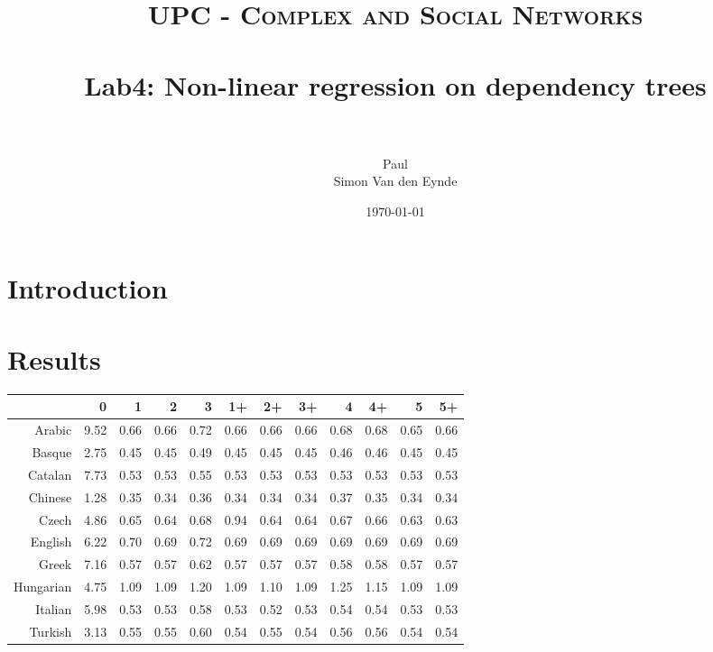 \documentclass[paper=a4, fontsize=11pt]{scrartcl} %
\title{	
\normalfont \normalsize 
\textsc{UPC - Complex and Social Networks} \\ [25pt] %
\horrule{0.5pt} \\[0.4cm] %
\huge Lab4: Non-linear regression on dependency trees \\ %
\horrule{2pt} \\[0.5cm] %
}
\author{Paul\\Simon Van den Eynde} %
\date{\normalsize\today} %
\begin{document}
\maketitle %



\section{Introduction}

\section{Results}
\begin{table}[ht]
\centering
\begin{tabular}{rrrrrrrrrrrr}
  \hline
 & 0 & 1 & 2 & 3 & 1+ & 2+ & 3+ & 4 & 4+ & 5 & 5+ \\ 
  \hline
Arabic & 9.52 & 0.66 & 0.66 & 0.72 & 0.66 & 0.66 & 0.66 & 0.68 & 0.68 & 0.65 & 0.66 \\ 
  Basque & 2.75 & 0.45 & 0.45 & 0.49 & 0.45 & 0.45 & 0.45 & 0.46 & 0.46 & 0.45 & 0.45 \\ 
  Catalan & 7.73 & 0.53 & 0.53 & 0.55 & 0.53 & 0.53 & 0.53 & 0.53 & 0.53 & 0.53 & 0.53 \\ 
  Chinese & 1.28 & 0.35 & 0.34 & 0.36 & 0.34 & 0.34 & 0.34 & 0.37 & 0.35 & 0.34 & 0.34 \\ 
  Czech & 4.86 & 0.65 & 0.64 & 0.68 & 0.94 & 0.64 & 0.64 & 0.67 & 0.66 & 0.63 & 0.63 \\ 
  English & 6.22 & 0.70 & 0.69 & 0.72 & 0.69 & 0.69 & 0.69 & 0.69 & 0.69 & 0.69 & 0.69 \\ 
  Greek & 7.16 & 0.57 & 0.57 & 0.62 & 0.57 & 0.57 & 0.57 & 0.58 & 0.58 & 0.57 & 0.57 \\ 
  Hungarian & 4.75 & 1.09 & 1.09 & 1.20 & 1.09 & 1.10 & 1.09 & 1.25 & 1.15 & 1.09 & 1.09 \\ 
  Italian & 5.98 & 0.53 & 0.53 & 0.58 & 0.53 & 0.52 & 0.53 & 0.54 & 0.54 & 0.53 & 0.53 \\ 
  Turkish & 3.13 & 0.55 & 0.55 & 0.60 & 0.54 & 0.55 & 0.54 & 0.56 & 0.56 & 0.54 & 0.54 \\ 
   \hline
\end{tabular}
\end{table}
\end{document}

